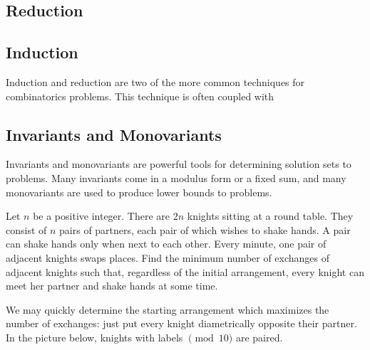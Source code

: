 \documentclass[11pt]{scrartcl}
\theoremstyle{plain} %
\theoremstyle{definition}
\theoremstyle{remark}
\theoremstyle{empty}
\theoremstyle{empty}
\theoremstyle{empty}
\theoremstyle{empty}
\theoremstyle{empty}
\theoremstyle{empty}
\begin{document}
\subsection{Reduction}

\begin{problem}
    
\end{problem}


\subsection{Induction}

Induction and reduction are two of the more common techniques for combinatorics problems. This technique is often coupled with 

\subsection{Invariants and Monovariants}

Invariants and monovariants are powerful tools for determining solution sets to problems. Many invariants come in a modulus form or a fixed sum, and many monovariants are used to produce lower bounds to problems. 

\begin{problem}[2024 ISL C3]
Let $n$ be a positive integer. There are $2n$ knights sitting at a round table. They consist of $n$ pairs of partners, each pair of which wishes to shake hands. A pair can shake hands only when next to each other. Every minute, one pair of adjacent knights swaps places. Find the minimum number of exchanges of adjacent knights such that, regardless of the initial arrangement, every knight can meet her partner and shake hands at some time.	
\end{problem}

We may quickly determine the starting arrangement which maximizes the number of exchanges: just put every knight diametrically opposite their partner. In the picture below, knights with labels $\pmod{10}$ are paired. 

\begin{center}
\end{center}
\end{document}
